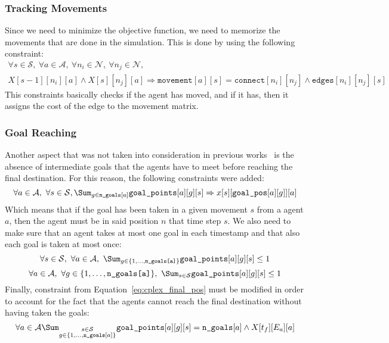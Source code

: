 \subsubsection{Tracking Movements}
Since we need to minimize the objective function, we need to memorize the
movements that are done in the simulation. This is done by using the following 
constraint:
\begin{equation}
  \begin{array}{c}
    \forall s\in\mathcal{S},~\forall a\in\mathcal{A},~\forall
    n_i\in\mathcal{N},~\forall n_j\in\mathcal{N},\\
    X[s-1][n_i][a] \wedge X[s][n_j][a] \Rightarrow \texttt{movement}[a][s] = 
    \texttt{connect}[n_i][n_j] \wedge \texttt{edges}[n_i][n_j][s]
  \end{array}
  \label{eq:movement_track}
\end{equation}
This constraints basically checks if the agent has moved, and if it has, then
it assigns the cost of the edge to the movement matrix.
%
\subsubsection{Goal Reaching}
Another aspect that was not taken into consideration in previous
works~\cite{picat1, picat2} is the absence of intermediate goals that the
agents have to meet before reaching the final destination. For this reason, the
following constraints were added:
\begin{equation}
  \forall a \in \mathcal{A},~\forall s\in\mathcal{S},
  \Sum_{g\in\texttt{n\_goals}[a]} \texttt{goal\_points}[a][g][s] \Rightarrow
  x[s][\texttt{goal\_pos}[a][g]][a]
  \label{eq:take_goals}
\end{equation}
Which means that if the goal has been taken in a given movement $s$ from a
agent $a$, then the agent must be in said position $n$ that time step $s$.
\newline
We also need to make sure that an agent takes at most one goal in each
timestamp and that also each goal is taken at most once:
\begin{equation}
  \forall s\in\mathcal{S},~\forall a \in\mathcal{A},~\Sum_{g\in
  \{1,\hdots,\texttt{n\_goals[a]}\}} \texttt{goal\_points}[a][g][s] \leq 1
  \label{eq:one_goal_one_step}
\end{equation}
\begin{equation}
  \forall a\in\mathcal{A},~\forall g \in\{1,\hdots,\texttt{n\_goals[a]}\}, 
  ~\Sum_{s\in \mathcal{S}} \texttt{goal\_points}[a][g][s] \leq 1
  \label{eq:one_goal_per_life}
\end{equation}
Finally, constraint from Equation~\ref{eq:cplex_final_pos} must be modified in
order to account for the fact that the agents cannot reach the final
destination without having taken the goals:
\begin{equation}
  \forall a\in\mathcal{A} 
  \Sum_{\substack{s\in\mathcal{S}\\g\in\{1,\hdots,\texttt{n\_goals}[a]\}}}
  \texttt{goal\_points}[a][g][s] = \texttt{n\_goals}[a] \wedge X[t_f][E_a][a]
  \label{eq:final_pos}
\end{equation}
%
%
